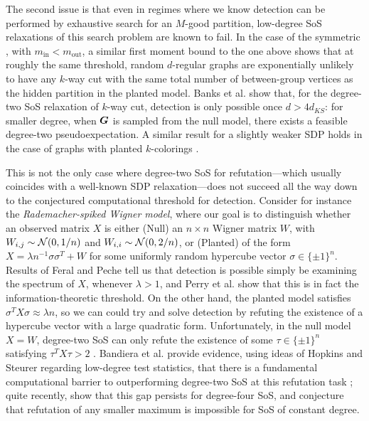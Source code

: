The second issue is that even in regimes where we know detection can be performed by exhaustive search for an $M$-good partition, low-degree SoS relaxations of this search problem are known to fail. In the case of the symmetric \model, with $m_{\text{in}} < m_{\text{out}}$, a similar first moment bound to the one above shows that at roughly the same threshold, random $d$-regular graphs are exponentially unlikely to have any $k$-way cut with the same total number of between-group  vertices as the hidden partition in the planted model. Banks et al. \cite{banks2017lov} show that, for the degree-two SoS relaxation of $k$-way cut, detection is only possible once $d> 4d_{KS}$: for smaller degree, when $\boldsymbol{G}$ is sampled from the null model, there exists a feasible degree-two pseudoexpectation. A similar result for a slightly weaker SDP holds in the case of \ER graphs with planted $k$-colorings \cite{banks2019vector}. 

This is not the only case where degree-two SoS for refutation---which usually coincides with a well-known SDP relaxation---does not succeed all the way down to the conjectured computational threshold for detection.    Consider for instance the \emph{Rademacher-spiked Wigner model}, where our goal is to distinguish whether an observed matrix $X$ is either (Null) an $n\times n$ Wigner matrix $W$, with $W_{i,j} \sim \mathcal{N}(0,1/n)$ and $W_{i,i} \sim \mathcal{N}(0,2/n)$, or (Planted) of the form $X = \lambda n^{-1} \sigma\sigma^T + W$ for some uniformly random hypercube vector $\sigma \in \{\pm 1\}^n$. Results of Feral and Peche \cite{feral2007largest} tell us that detection is possible simply be examining the spectrum of $X$, whenever $\lambda > 1$, and Perry et al. \cite{perry2016optimality} show that this is in fact the information-theoretic threshold. On the other hand, the planted model satisfies $\sigma^T X \sigma \approx \lambda n$, so we can  could try and solve detection by refuting the existence of a hypercube vector with a large quadratic form. Unfortunately, in the null model $X = W$, degree-two SoS can only refute the existence of some $\tau \in \{\pm 1\}^n$ satisfying $\tau^T X \tau >2$ \cite{montanari2015semidefinite}. Bandiera et al. provide evidence, using ideas of Hopkins and Steurer regarding low-degree test statistics, that there is a fundamental computational barrier to outperforming degree-two SoS at this refutation task \cite{bandeira2019computational}; quite recently, \cite{kunisky2019tight} show that this gap persists for degree-four SoS, and conjecture that refutation of any smaller maximum is impossible for SoS of constant degree.

